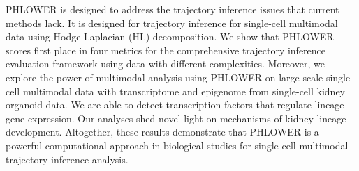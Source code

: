 PHLOWER is designed to address the trajectory inference issues that current methods lack. It is designed for trajectory inference for single-cell multimodal data using Hodge Laplacian (HL) decomposition. We show that PHLOWER scores first place in four metrics for the comprehensive trajectory inference evaluation framework using data with different complexities. Moreover, we explore the power of multimodal analysis using PHLOWER on large-scale single-cell multimodal data with transcriptome and epigenome from single-cell kidney organoid data. We are able to detect transcription factors that regulate lineage gene expression. Our analyses shed novel light on mechanisms of kidney lineage development. Altogether, these results demonstrate that PHLOWER is a powerful computational approach in biological studies for single-cell multimodal trajectory inference analysis.

